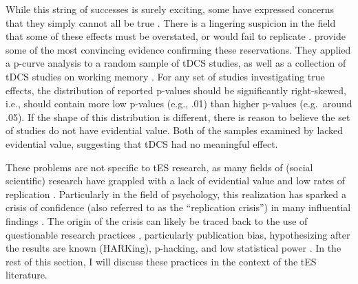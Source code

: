 \documentclass[11pt,]{memoir}
\begin{document}
While this string of successes is surely exciting, some have expressed concerns that they simply cannot all be true \autocites{Bestmann2017}{Parkin2015}. There is a lingering suspicion in the field that some of these effects must be overstated, or would fail to replicate \autocite{Heroux2017}. \textcite{Medina2017} provide some of the most convincing evidence confirming these reservations. They applied a p-curve analysis \autocite{Simonsohn2014} to a random sample of tDCS studies, as well as a collection of tDCS studies on working memory \autocite[from a meta-analysis by][]{Mancuso2016}. For any set of studies investigating true effects, the distribution of reported p-values should be significantly right-skewed, i.e., should contain more low p-values (e.g., .01) than higher p-values (e.g.~around .05). If the shape of this distribution is different, there is reason to believe the set of studies do not have evidential value. Both of the samples examined by \textcite{Medina2017} lacked evidential value, suggesting that tDCS had no meaningful effect.

These problems are not specific to tES research, as many fields of (social scientific) research have grappled with a lack of evidential value \autocites{Brodeur2016}{Simmons2017} and low rates of replication \autocites{OSC2015}{Camerer2018}{Klein2018}. Particularly in the field of psychology, this realization has sparked a crisis of confidence (also referred to as the ``replication crisis'') in many influential findings \autocites{Baker2015}{Pashler2012}. The origin of the crisis can likely be traced back to the use of questionable research practices \autocite{John2012}, particularly publication bias, hypothesizing after the results are known (HARKing), p-hacking, and low statistical power \autocites{Munafo2017}{Bishop2019}. In the rest of this section, I will discuss these practices in the context of the tES literature.
\end{document}
